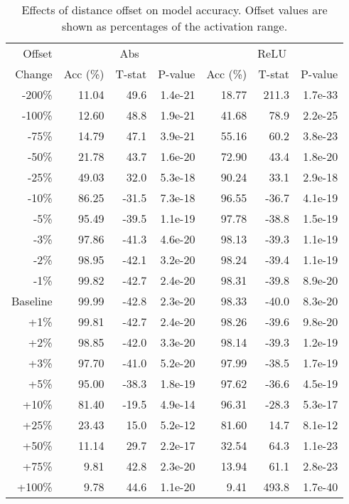 \begin{table}[H]
\centering
\begin{tabular}{r|rrr|rrr}
Offset & \multicolumn{3}{|c|}{Abs} & \multicolumn{3}{|c}{ReLU} \\
Change & Acc (\%) & T-stat & P-value & Acc (\%) & T-stat & P-value \\
\hline
-200\% & 11.04 & 49.6 & 1.4e-21 & 18.77 & 211.3 & 1.7e-33 \\
-100\% & 12.60 & 48.8 & 1.9e-21 & 41.68 & 78.9 & 2.2e-25 \\
-75\% & 14.79 & 47.1 & 3.9e-21 & 55.16 & 60.2 & 3.8e-23 \\
-50\% & 21.78 & 43.7 & 1.6e-20 & 72.90 & 43.4 & 1.8e-20 \\
-25\% & 49.03 & 32.0 & 5.3e-18 & 90.24 & 33.1 & 2.9e-18 \\
-10\% & 86.25 & -31.5 & 7.3e-18 & 96.55 & -36.7 & 4.1e-19 \\
-5\% & 95.49 & -39.5 & 1.1e-19 & 97.78 & -38.8 & 1.5e-19 \\
-3\% & 97.86 & -41.3 & 4.6e-20 & 98.13 & -39.3 & 1.1e-19 \\
-2\% & 98.95 & -42.1 & 3.2e-20 & 98.24 & -39.4 & 1.1e-19 \\
-1\% & 99.82 & -42.7 & 2.4e-20 & 98.31 & -39.8 & 8.9e-20 \\
Baseline & 99.99 & -42.8 & 2.3e-20 & 98.33 & -40.0 & 8.3e-20 \\
+1\% & 99.81 & -42.7 & 2.4e-20 & 98.26 & -39.6 & 9.8e-20 \\
+2\% & 98.85 & -42.0 & 3.3e-20 & 98.14 & -39.3 & 1.2e-19 \\
+3\% & 97.70 & -41.0 & 5.2e-20 & 97.99 & -38.5 & 1.7e-19 \\
+5\% & 95.00 & -38.3 & 1.8e-19 & 97.62 & -36.6 & 4.5e-19 \\
+10\% & 81.40 & -19.5 & 4.9e-14 & 96.31 & -28.3 & 5.3e-17 \\
+25\% & 23.43 & 15.0 & 5.2e-12 & 81.60 & 14.7 & 8.1e-12 \\
+50\% & 11.14 & 29.7 & 2.2e-17 & 32.54 & 64.3 & 1.1e-23 \\
+75\% & 9.81 & 42.8 & 2.3e-20 & 13.94 & 61.1 & 2.8e-23 \\
+100\% & 9.78 & 44.6 & 1.1e-20 & 9.41 & 493.8 & 1.7e-40 \\
\end{tabular}
\caption{Effects of distance offset on model accuracy. Offset values are shown as percentages of the activation range.}
\label{tab:stat_offset}
\end{table}
